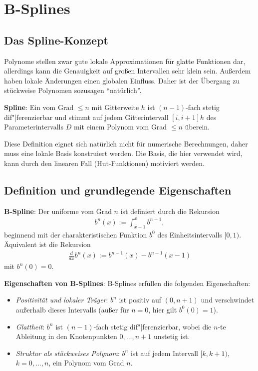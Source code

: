 \section{%
    B-Splines%
}

\subsection{%
    Das Spline-Konzept%
}

Polynome stellen zwar gute lokale Approximationen für glatte Funktionen dar,
allerdings kann die Genauigkeit auf großen Intervallen sehr klein sein.
Außerdem haben lokale Änderungen einen globalen Einfluss.
Daher ist der Übergang zu stückweise Polynomen sozusagen "`natürlich"'.

\textbf{Spline}:
Ein  vom Grad $\le n$ mit Gitterweite $h$ ist $(n - 1)$-fach stetig
dif"|ferenzierbar und stimmt auf jedem Gitterintervall $[i, i+1]h$ des Parameterintervalls $D$ mit
einem Polynom vom Grad $\le n$ überein.

Diese Definition eignet sich natürlich nicht für numerische Berechnungen,
daher muss eine lokale Basis konstruiert werden.
Die Basis, die hier verwendet wird, kann durch den linearen Fall (Hut-Funktionen) motiviert werden.

\subsection{%
    Definition und grundlegende Eigenschaften%
}

\textbf{B-Spline}:
Der uniforme  vom Grad $n$ ist definiert durch die Rekursion
\begin{align*}
    b^n(x) := \int_{x-1}^x b^{n-1},
\end{align*}
beginnend mit der charakteristischen Funktion $b^0$ des Einheitsintervalls $[0, 1)$.
Äquivalent ist die Rekursion
\begin{align*}
    \frac{d}{dx} b^n(x) := b^{n-1}(x) - b^{n-1}(x - 1)
\end{align*}
mit $b^n(0) = 0$.

\linie

\textbf{Eigenschaften von B-Splines}:
B-Splines erfüllen die folgenden Eigenschaften:
\begin{itemize}
    \item
    \emph{Positivität und lokaler Träger}:
    $b^n$ ist positiv auf $(0, n + 1)$ und verschwindet außerhalb dieses Intervalls
    (außer für $n = 0$, hier gilt $b^0(0) = 1$).

    \item
    \emph{Glattheit}:
    $b^n$ ist $(n - 1)$-fach stetig dif"|ferenzierbar, wobei die $n$-te Ableitung in den
    Knotenpunkten $0, \dotsc, n + 1$ unstetig ist.

    \item
    \emph{Struktur als stückweises Polynom}:
    $b^n$ ist auf jedem Intervall $[k, k + 1)$, $k = 0, \dotsc, n$, ein Polynom vom Grad $n$.
\end{itemize}

